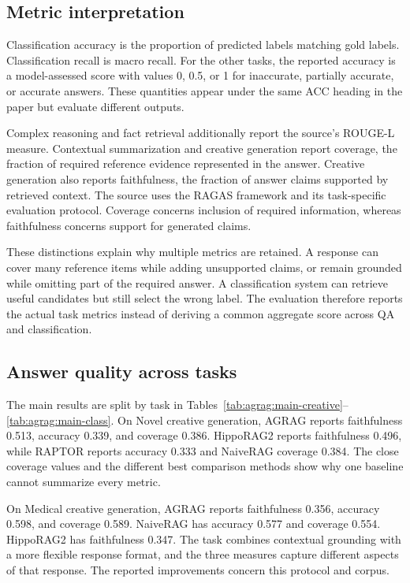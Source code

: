 \subsection{Metric interpretation}
Classification accuracy is the proportion of predicted labels matching gold labels. Classification recall is macro recall. For the other tasks, the reported accuracy is a model-assessed score with values 0, 0.5, or 1 for inaccurate, partially accurate, or accurate answers. These quantities appear under the same ACC heading in the paper but evaluate different outputs.

Complex reasoning and fact retrieval additionally report the source's ROUGE-L measure. Contextual summarization and creative generation report coverage, the fraction of required reference evidence represented in the answer. Creative generation also reports faithfulness, the fraction of answer claims supported by retrieved context. The source uses the RAGAS framework and its task-specific evaluation protocol. Coverage concerns inclusion of required information, whereas faithfulness concerns support for generated claims.

These distinctions explain why multiple metrics are retained. A response can cover many reference items while adding unsupported claims, or remain grounded while omitting part of the required answer. A classification system can retrieve useful candidates but still select the wrong label. The evaluation therefore reports the actual task metrics instead of deriving a common aggregate score across QA and classification.







\subsection{Answer quality across tasks}
The main results are split by task in Tables~\ref{tab:agrag:main-creative}--\ref{tab:agrag:main-class}. On Novel creative generation, AGRAG reports faithfulness 0.513, accuracy 0.339, and coverage 0.386. HippoRAG2 reports faithfulness 0.496, while RAPTOR reports accuracy 0.333 and NaiveRAG coverage 0.384. The close coverage values and the different best comparison methods show why one baseline cannot summarize every metric.

On Medical creative generation, AGRAG reports faithfulness 0.356, accuracy 0.598, and coverage 0.589. NaiveRAG has accuracy 0.577 and coverage 0.554. HippoRAG2 has faithfulness 0.347. The task combines contextual grounding with a more flexible response format, and the three measures capture different aspects of that response. The reported improvements concern this protocol and corpus.

